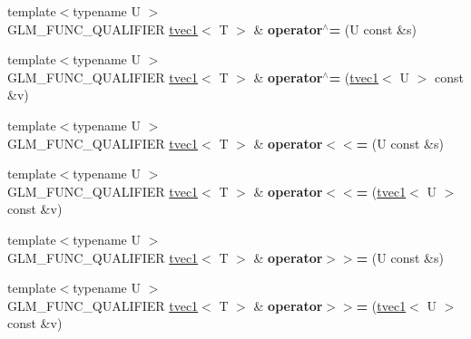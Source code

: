 \begin{DoxyCompactItemize}
\item 
\hypertarget{structglm_1_1detail_1_1tvec1_a3f3f207c7dfdeb1abd780f4c596ea993}{{\footnotesize template$<$typename U $>$ }\\G\-L\-M\-\_\-\-F\-U\-N\-C\-\_\-\-Q\-U\-A\-L\-I\-F\-I\-E\-R \hyperlink{structglm_1_1detail_1_1tvec1}{tvec1}$<$ T $>$ \& {\bfseries operator$^\wedge$=} (U const \&s)}\label{structglm_1_1detail_1_1tvec1_a3f3f207c7dfdeb1abd780f4c596ea993}

\item 
\hypertarget{structglm_1_1detail_1_1tvec1_a66cc9071d4327de86d0e48126280fb52}{{\footnotesize template$<$typename U $>$ }\\G\-L\-M\-\_\-\-F\-U\-N\-C\-\_\-\-Q\-U\-A\-L\-I\-F\-I\-E\-R \hyperlink{structglm_1_1detail_1_1tvec1}{tvec1}$<$ T $>$ \& {\bfseries operator$^\wedge$=} (\hyperlink{structglm_1_1detail_1_1tvec1}{tvec1}$<$ U $>$ const \&v)}\label{structglm_1_1detail_1_1tvec1_a66cc9071d4327de86d0e48126280fb52}

\item 
\hypertarget{structglm_1_1detail_1_1tvec1_af500a6961d21ce10af87656336ff3743}{{\footnotesize template$<$typename U $>$ }\\G\-L\-M\-\_\-\-F\-U\-N\-C\-\_\-\-Q\-U\-A\-L\-I\-F\-I\-E\-R \hyperlink{structglm_1_1detail_1_1tvec1}{tvec1}$<$ T $>$ \& {\bfseries operator$<$$<$=} (U const \&s)}\label{structglm_1_1detail_1_1tvec1_af500a6961d21ce10af87656336ff3743}

\item 
\hypertarget{structglm_1_1detail_1_1tvec1_a6b6425531508763729b32073d0b0c9ab}{{\footnotesize template$<$typename U $>$ }\\G\-L\-M\-\_\-\-F\-U\-N\-C\-\_\-\-Q\-U\-A\-L\-I\-F\-I\-E\-R \hyperlink{structglm_1_1detail_1_1tvec1}{tvec1}$<$ T $>$ \& {\bfseries operator$<$$<$=} (\hyperlink{structglm_1_1detail_1_1tvec1}{tvec1}$<$ U $>$ const \&v)}\label{structglm_1_1detail_1_1tvec1_a6b6425531508763729b32073d0b0c9ab}

\item 
\hypertarget{structglm_1_1detail_1_1tvec1_a348bb1ecfc6b424a4b15b0da58c2a09d}{{\footnotesize template$<$typename U $>$ }\\G\-L\-M\-\_\-\-F\-U\-N\-C\-\_\-\-Q\-U\-A\-L\-I\-F\-I\-E\-R \hyperlink{structglm_1_1detail_1_1tvec1}{tvec1}$<$ T $>$ \& {\bfseries operator$>$$>$=} (U const \&s)}\label{structglm_1_1detail_1_1tvec1_a348bb1ecfc6b424a4b15b0da58c2a09d}

\item 
\hypertarget{structglm_1_1detail_1_1tvec1_a8ece91fd2d7066939275cec489811fcf}{{\footnotesize template$<$typename U $>$ }\\G\-L\-M\-\_\-\-F\-U\-N\-C\-\_\-\-Q\-U\-A\-L\-I\-F\-I\-E\-R \hyperlink{structglm_1_1detail_1_1tvec1}{tvec1}$<$ T $>$ \& {\bfseries operator$>$$>$=} (\hyperlink{structglm_1_1detail_1_1tvec1}{tvec1}$<$ U $>$ const \&v)}\label{structglm_1_1detail_1_1tvec1_a8ece91fd2d7066939275cec489811fcf}

\end{DoxyCompactItemize}
